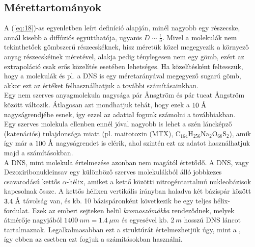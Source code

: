 \section{} \label{sec:4}

\subsection{Mérettartományok}
A (\ref{eq:18})-as egyenletben leírt definíció alapján, minél nagyobb egy részecske, annál kisebb a diffúziós együtthatója, ugyanis $D \sim \frac{1}{a}$. Mivel a molekulák nem tekinthetőek gömbszerű részecskéknek, hisz méretük közel megegyezik a környező anyag részecskéinek méretével, alakja pedig ténylegesen nem egy gömb, ezért az extrapoláció csak erős közelítés esetében lehetséges. Ha közelítésként feltesszük, hogy a molekulák és pl. a DNS is egy méretarányával megegyező sugarú gömb, akkor ezt az értéket felhasználhatjuk a további számításainkban. \\
Egy nem szerves anyagmolekula nagysága pár \r{A}nsgtröm és pár tucat \r{A}ngström között változik. Átlagosan azt mondhatjuk tehát, hogy ezek a $10\ \text{\r{A}}$ nagyságrendjébe esnek, így ezzel az adattal fogunk számolni a továbbiakban. \\
Egy szerves molekula ellenben ennél jóval nagyobb is lehet a szén láncképző (katenációs) tulajdonsága miatt (pl. maitotoxin (MTX), $\text{C}_{164}\text{H}_{256}\text{Na}_{2}\text{O}_{68}\text{S}_{2}$\cite{maitotoxin}), amik így már a $100\ \text{\r{A}}$ nagyságrendet is elérik, ahol szintén ezt az adatot használhatjuk majd a számításokban. \\
A DNS, mint molekula értelmezése azonban nem magától értetődő. A DNS, vagy Dezoxiribonukleinsav egy különböző szerves molekulákból álló jobbkezes csavarodású kettős $\alpha$-hélix, amiket a kettő közötti nitrogéntartalmú nukleobázisok kapcsolnak össze. A kettős hélixen vertikális irányban haladva két bázispár között $3.4\ \text{\r{A}}$ távolság van, és kb. 10 bázispáronként következik be egy teljes hélix-fordulat\cite{watson1953molecular}. Ezek az emberi sejteken belül \emph{kromoszómákba} rendeződnek, melyek átmérője nagyjából $1400\ nm = 1.4\ \mu m$ és egyesével kb. $2\ m$ hosszú DNS láncot tartalmaznak\cite{chromosome}. Legalkalmasabban ezt a struktúrát értelmezhetjük úgy, mint a , így ebben az esetben ezt fogjuk a számításokban használni.

